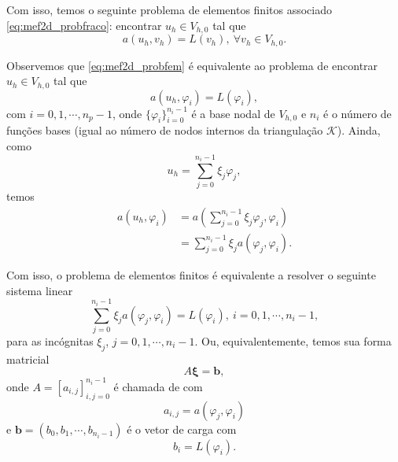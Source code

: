 Com isso, temos o seguinte problema de elementos finitos associado \eqref{eq:mef2d_probfraco}: encontrar $u_h\in V_{h,0}$ tal que
\begin{equation}\label{eq:mef2d_probfem}
  a(u_h,v_h) = L(v_h),~\forall v_h\in V_{h,0}.
\end{equation}

Observemos que \eqref{eq:mef2d_probfem} é equivalente ao problema de encontrar $u_h\in V_{h,0}$ tal que
\begin{equation}\label{eq:mef2d_proba1}
  a(u_h,\varphi_i) = L(\varphi_i),
\end{equation}
com $i=0, 1, \cdots, n_p-1$, onde $\{\varphi_i\}_{i=0}^{n_i-1}$ é a base nodal de $V_{h,0}$ e $n_i$ é o número de funções bases (igual ao número de nodos internos da triangulação $\mathcal{K}$). Ainda, como
\begin{equation}
  u_h = \sum_{j=0}^{n_i-1} \xi_j\varphi_j,
\end{equation}
temos 
\begin{align}
  a(u_h, \varphi_i) &= a\left(\sum_{j=0}^{n_i-1}\xi_j\varphi_j,\varphi_i\right) \\
  &= \sum_{j=0}^{n_i-1}\xi_ja(\varphi_j,\varphi_i).
\end{align}

Com isso, o problema de elementos finitos é equivalente a resolver o seguinte sistema linear
\begin{equation}
  \sum_{j=0}^{n_i-1}\xi_ja(\varphi_j,\varphi_i) = L(\varphi_i),~i=0, 1, \cdots, n_i-1,
\end{equation}
para as incógnitas $\xi_j$, $j=0, 1, \cdots, n_i-1$. Ou, equivalentemente, temos sua forma matricial
\begin{equation}
  A\pmb{\xi} = \pmb{b},
\end{equation}
onde $A = [a_{i,j}]_{i,j=0}^{n_i-1}$ é chamada de  com
\begin{equation}
  a_{i,j} = a(\varphi_j, \varphi_i)
\end{equation}
e $\pmb{b} = (b_0, b_1, \cdots, b_{n_i-1})$ é o vetor de carga com
\begin{equation}
  b_i = L(\varphi_i).
\end{equation}


